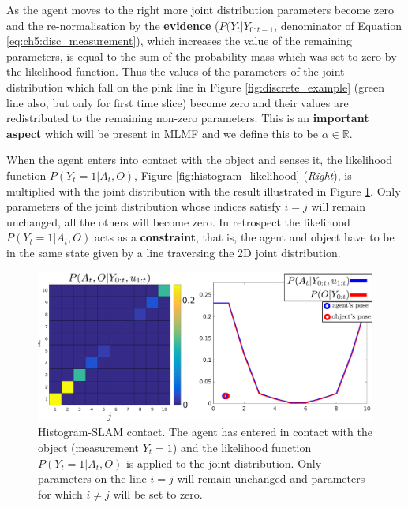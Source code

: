 As the agent moves to the right more joint distribution parameters become zero and the re-normalisation by the \textbf{evidence} ($P(Y_t|Y_{0:t-1}$, denominator of Equation \ref{eq:ch5:disc_measurement}), 
which increases the value of the remaining parameters, is equal to the sum of the probability mass which was set to zero by the likelihood function.
Thus the values of the parameters of the joint distribution which fall on the pink line in Figure \ref{fig:discrete_example} 
(green line also, but only for first time slice) become zero and their values are redistributed to the remaining non-zero parameters. 
This is an \textbf{important aspect} which will be present in MLMF and we define this to be $\alpha \in \mathbb{R}$.

When the agent enters into contact with the object and senses it, the likelihood function $P(Y_t=1|A_t,O)$, Figure \ref{fig:histogram_likelihood} (\textit{Right}), is 
multiplied with the joint distribution with the result illustrated in Figure \ref{fig:discrete_example_contact}. Only parameters of the joint distribution whose indices
satisfy $i = j$ will remain unchanged, all the others will become zero. In retrospect the likelihood $P(Y_t=1|A_t,O)$ acts as a \textbf{constraint}, 
that is, the agent and object have to be in the same state given by a line traversing the 2D joint distribution.

\begin{figure}
 \centering
 \includegraphics[width=\textwidth]{./ch5-MLMF/Figures/explenation/joint_marginal_contact.pdf}
 \caption{Histogram-SLAM contact. The agent has entered in contact with the object (measurement $Y_t = 1$) and the likelihood function $P(Y_t=1|A_t,O)$ is applied to the joint
 distribution. Only parameters on the line $i=j$ will remain unchanged and parameters for which $i \not= j$ will be set to zero.}
 \label{fig:discrete_example_contact}
\end{figure}

